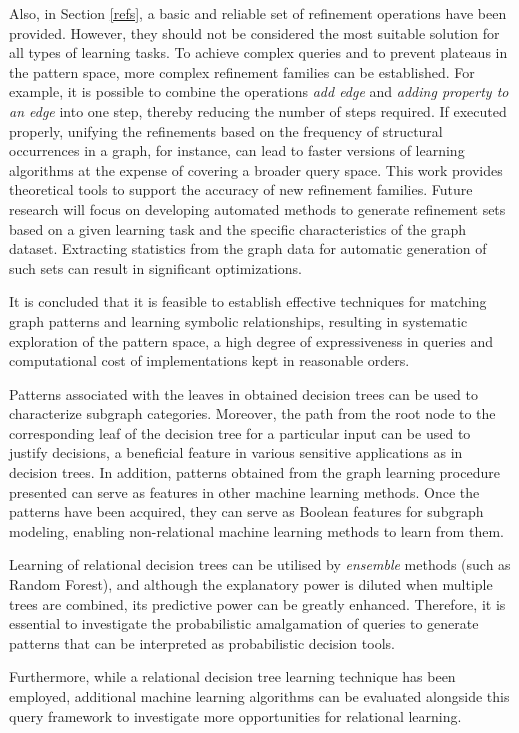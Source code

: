 \documentclass{article}%
\begin{document}
Also, in Section \ref{refs}, a basic and reliable set of refinement operations have been provided. However, they should not be considered the most suitable solution for all types of learning tasks. To achieve complex queries and to prevent plateaus in the pattern space, more complex refinement families can be established. For example, it is possible to combine the operations \emph{ add edge} and \emph{adding property to an edge} into one step, thereby reducing the number of steps required. If executed properly, unifying the refinements based on the frequency of structural occurrences in a graph, for instance, can lead to faster versions of learning algorithms at the expense of covering a broader query space. This work provides theoretical tools to support the accuracy of new refinement families. Future research will focus on developing automated methods to generate refinement sets based on a given learning task and the specific characteristics of the graph dataset. Extracting statistics from the graph data for automatic generation of such sets can result in significant optimizations. 

It is concluded that it is feasible to establish effective techniques for matching graph patterns and learning symbolic relationships, resulting in systematic exploration of the pattern space, a high degree of expressiveness in queries and computational cost of implementations kept in reasonable orders.

Patterns associated with the leaves in obtained decision trees can be used to characterize subgraph categories. Moreover, the path from the root node to the corresponding leaf of the decision tree for a particular input can be used to justify decisions, a beneficial feature in various sensitive applications as in decision trees. In addition, patterns obtained from the graph learning procedure presented can serve as features in other machine learning methods. Once the patterns have been acquired, they can serve as Boolean features for subgraph modeling, enabling non-relational machine learning methods to learn from them.

Learning of relational decision trees can be utilised by \textit{ensemble} methods (such as Random Forest), and although the explanatory power is diluted when multiple trees are combined, its predictive power can be greatly enhanced. Therefore, it is essential to investigate the probabilistic amalgamation of queries to generate patterns that can be interpreted as probabilistic decision tools. 

Furthermore, while a relational decision tree learning technique has been employed, additional machine learning algorithms can be evaluated alongside this query framework to investigate more opportunities for relational learning.%
\end{document}
